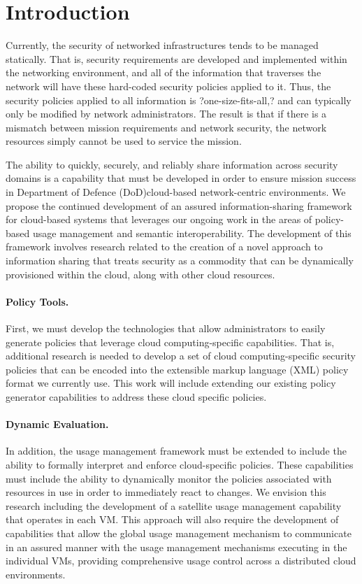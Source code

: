 \documentclass[10pt,letterpaper]{article}
\author{Christopher C. Lamb}
\begin{document}
\section{Introduction}
\label{sec:intro}
Currently, the security of networked infrastructures tends to be managed statically. That is, security requirements are developed and implemented within the networking environment, and all of the information that traverses the network will have these hard-coded security policies applied to it. Thus, the security policies applied to all information is ?one-size-fits-all,? and can typically only be modified by network administrators. The result is that if there is a mismatch between mission requirements and network security, the network resources simply cannot be used to service the mission.

The ability to quickly, securely, and reliably share information across security domains is a capability that must be developed in order to ensure mission success in Department of Defence (DoD)cloud-based network-centric environments. We propose the continued development of an assured information-sharing framework for cloud-based systems that leverages our ongoing work in the areas of policy-based usage management and semantic interoperability. The development of this framework involves research related to the creation of a novel approach to information sharing that treats security as a commodity that can be dynamically provisioned within the cloud, along with other cloud resources.

\paragraph{Policy Tools.} First, we must develop the technologies that allow administrators to easily generate policies that leverage cloud computing-specific capabilities. That is, additional research is needed to develop a set of cloud computing-specific security policies that can be encoded into the extensible markup language (XML) policy format we currently use. This work will include extending our existing policy generator capabilities to address these cloud specific policies.

\paragraph{Dynamic Evaluation.} In addition, the usage management framework must be extended to include the ability to formally interpret and enforce cloud-specific policies. These capabilities must include the ability to dynamically monitor the policies associated with resources in use in order to immediately react to changes. We envision this research including the development of a satellite usage management capability that operates in each VM. This approach will also require the development of capabilities that allow the global usage management mechanism to communicate in an assured manner with the usage management mechanisms executing in the individual VMs, providing comprehensive usage control across a distributed cloud environments.
\end{document}

